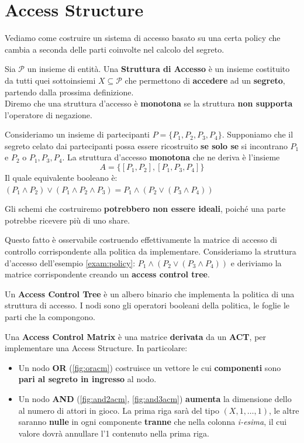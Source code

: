 \section{Access Structure}
Vediamo come costruire un sistema di accesso basato su una certa policy che cambia a seconda delle parti coinvolte nel calcolo del segreto.
\begin{definition}
Sia $\mathcal{P}$ un insieme di entità. Una \textbf{Struttura di Accesso} è un insieme costituito da tutti quei sottoinsiemi $X\subseteq\mathcal{P}$ che permettono di \textbf{accedere} ad un \textbf{segreto}, partendo dalla prossima definizione.\\
Diremo che una struttura d'accesso è \textbf{monotona} se la struttura \textbf{non supporta} l'operatore di negazione.
\end{definition}
\begin{example}\label{exam:policy}Consideriamo un insieme di partecipanti $P=\{P_1,P_2,P_3,P_4\}$. Supponiamo che il segreto celato dai partecipanti possa essere ricostruito \textbf{se solo se} si incontrano $P_1$ e $P_2$ o $P_1,P_3,P_4$. La struttura d'accesso \textbf{monotona} che ne deriva è l'insieme
\[A=\{[P_1,P_2],[P_1,P_3,P_4]\}\]
Il quale equivalente booleano è: $(P_1\land P_2)\lor (P_1\land P_2\land P_3)=P_1\land(P_2\lor (P_3\land P_4))$
\end{example}
\begin{remark}
Gli schemi che costruiremo \textbf{potrebbero non essere ideali}, poiché una parte potrebbe ricevere più di uno share.
\end{remark}
Questo fatto è osservabile costruendo effettivamente la matrice di accesso di controllo corrispondente alla politica da implementare.
Consideriamo la struttura d'accesso dell'esempio \ref{exam:policy}: $P_1\land(P_2\lor (P_3\land P_4))$ e deriviamo la matrice corrispondente creando un \textbf{access control tree}.
\begin{definition}\label{def:act}
Un \textbf{Access Control Tree} è un albero binario che implementa la politica di una struttura di accesso. I nodi sono gli operatori booleani della politica, le foglie le parti che la compongono. 
\end{definition}
\begin{definition}\label{def:acm}
Una \textbf{Access Control Matrix} è una matrice \textbf{derivata} da un \textbf{ACT}, per implementare una Access Structure. In particolare:
\begin{itemize}
    \item Un nodo \textbf{OR} (\cref{fig:oracm}) costruisce un vettore le cui \textbf{componenti} sono \textbf{pari al segreto in ingresso} al nodo.
    \item Un nodo \textbf{AND} (\cref{fig:and2acm}, \cref{fig:and3acm}) \textbf{aumenta} la dimensione dello al numero di attori in gioco. La prima riga sarà del tipo $(X,1,\dots,1)$, le altre saranno \textbf{nulle} in ogni componente \textbf{tranne} che nella colonna \textit{i-esima}, il cui valore dovrà annullare l'1 contenuto nella prima riga.
\end{itemize}
\end{definition}

